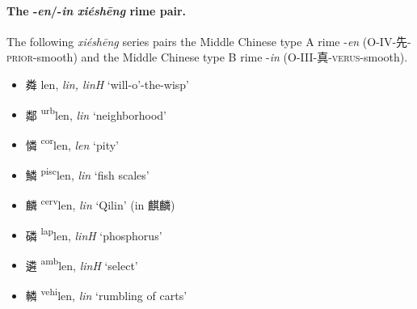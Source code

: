 \paragraph{The -\textit{en}/-\textit{in} \textit{xiéshēng} rime pair.}
\label{par:en-in-XS-pair}
The following \textit{xiéshēng} series pairs the Middle Chinese type A rime 
-\textit{en} (O-IV-先-\textsc{prior}-smooth)
and the Middle Chinese type B
rime -\textit{in}
(O-III-真-\textsc{verus}-smooth).

\begin{itemize}
\item {\Large{粦}} %
{\large{len}},
\textit{lin, linH} `will-o'-the-wisp' %

\item {\Large{鄰}} %
{\large{{\textsuperscript{urb}}len}},
\textit{lin} `neighborhood' %

\item {\Large{憐}} %
{\large{{\textsuperscript{cor}}len}},
\textit{len} `pity' %

\item {\Large{鱗}} %
{\large{{\textsuperscript{pisc}}len}},
\textit{lin} `fish scales' %

\item {\Large{麟}} %
{\large{{\textsuperscript{cerv}}len}},
\textit{lin} `Qilin' (in 麒麟) %

\item {\Large{磷}} %
{\large{{\textsuperscript{lap}}len}},
\textit{linH} `phosphorus' %

\item {\Large{遴}} %
{\large{{\textsuperscript{amb}}len}},
\textit{linH} `select' %

\item {\Large{轔}} %
{\large{{\textsuperscript{vehi}}len}},
\textit{lin} `rumbling of carts' %




\end{itemize}


